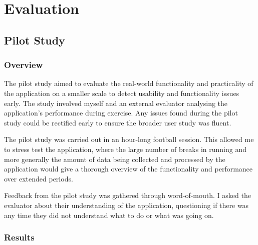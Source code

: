 \documentclass{l4proj}
\begin{document}
\chapter{Evaluation} 

\section{Pilot Study}

\subsection{Overview}

The pilot study aimed to evaluate the real-world functionality and practicality of the application on a smaller scale to detect usability and functionality issues early. The study involved myself and an external evaluator analysing the application’s performance during exercise. Any issues found during the pilot study could be rectified early to ensure the broader user study was fluent. 

The pilot study was carried out in an hour-long football session. This allowed me to stress test the application, where the large number of breaks in running and more generally the amount of data being collected and processed by the application would give a thorough overview of the functionality and performance over extended periods.

Feedback from the pilot study was gathered through word-of-mouth. I asked the evaluator about their understanding of the application, questioning if there was any time they did not understand what to do or what was going on. 

\subsection{Results}
\end{document}
